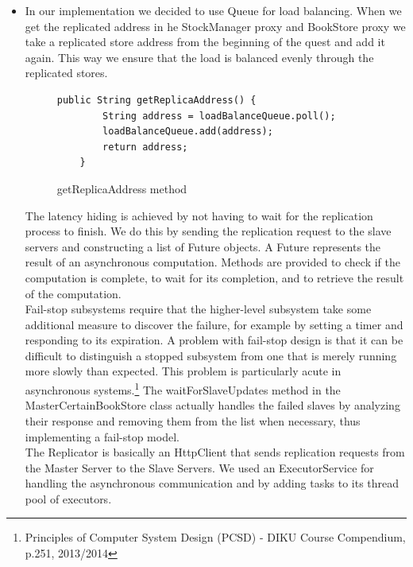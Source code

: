 \documentclass{article}      %
\begin{document}
\begin{itemize}
\item[1] In our implementation we decided to use Queue for load balancing. When we get the replicated address in he StockManager proxy and BookStore proxy we take a replicated store address from the beginning of the quest and add it again. This way we ensure that the load is balanced evenly through the replicated stores.\\

\begin{figure}[htbp]
\begin{center}
\begin{lstlisting}
public String getReplicaAddress() {
		String address = loadBalanceQueue.poll();
		loadBalanceQueue.add(address);
		return address;
	}
\end{lstlisting}
\caption{getReplicaAddress method}
\label{getReplicaAddress method}
\end{center}
\end{figure}

The latency hiding is achieved by not having to wait for the replication process to finish. We do this by sending the replication request to the slave servers and constructing a list of Future objects. A Future represents the result of an asynchronous computation. Methods are provided to check if the computation is complete, to wait for its completion, and to retrieve the result of the computation. \\ 

Fail-stop subsystems require that the higher-level subsystem take some additional measure to discover the failure, for example by setting a timer and responding to its expiration. A problem with fail-stop design is that it can be difficult to distinguish a stopped subsystem from one that is merely running more slowly than expected. This problem is particularly acute in asynchronous systems.\footnote{Principles of Computer System Design (PCSD) - DIKU Course Compendium, p.251, 2013/2014} The waitForSlaveUpdates method in the MasterCertainBookStore class actually handles the failed slaves by analyzing their response and removing them from the list when necessary, thus implementing a fail-stop model. \\ 

The Replicator is basically an HttpClient that sends replication requests  from the Master Server to the Slave Servers. We used an ExecutorService for handling the asynchronous communication and by adding tasks to its thread pool of executors.\\


\end{itemize}
\end{document}
